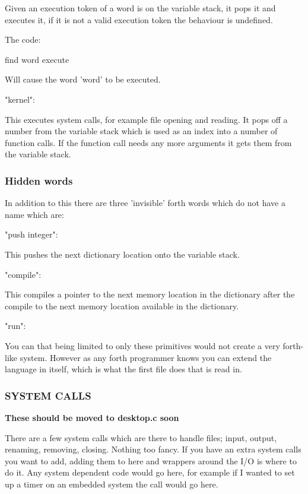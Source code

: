 Given an execution token of a word is on the variable stack, it pops it and executes it, if it is not a valid execution token the behaviour is undefined.

The code\-: \begin{DoxyVerb}find word execute
\end{DoxyVerb}


Will cause the word 'word' to be executed. \begin{DoxyVerb}   "kernel":
\end{DoxyVerb}


This executes system calls, for example file opening and reading. It pops off a number from the variable stack which is used as an index into a number of function calls. If the function call needs any more arguments it gets them from the variable stack.

\subsubsection*{Hidden words}

In addition to this there are three 'invisible' forth words which do not have a name which are\-: \begin{DoxyVerb}   "push integer":
\end{DoxyVerb}


This pushes the next dictionary location onto the variable stack. \begin{DoxyVerb}   "compile":
\end{DoxyVerb}


This compiles a pointer to the next memory location in the dictionary after the compile to the next memory location available in the dictionary. \begin{DoxyVerb}   "run":
\end{DoxyVerb}


You can that being limited to only these primitives would not create a very forth-\/like system. However as any forth programmer knows you can extend the language in itself, which is what the first file does that is read in.

\subsubsection*{S\-Y\-S\-T\-E\-M C\-A\-L\-L\-S}

{\bfseries These should be moved to desktop.\-c soon}

There are a few system calls which are there to handle files; input, output, renaming, removing, closing. Nothing too fancy. If you have an extra system calls you want to add, adding them to here and wrappers around the I/\-O is where to do it. Any system dependent code would go here, for example if I wanted to set up a timer on an embedded system the call would go here.

